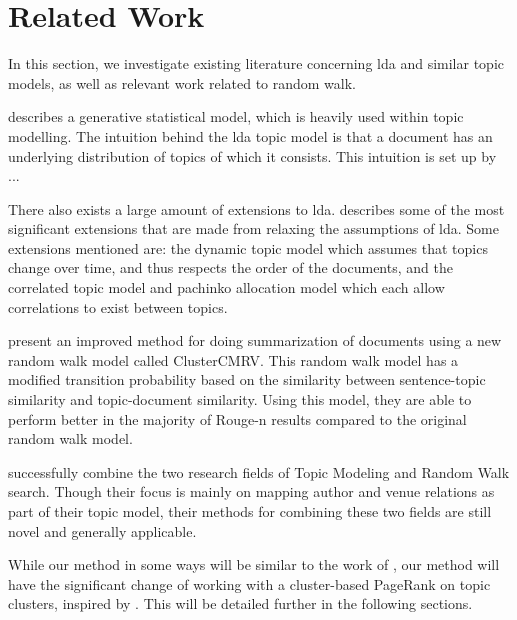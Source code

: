 \section{Related Work}\label{sec:related-works}
In this section, we investigate existing literature concerning \gls{lda} and similar topic models, as well as relevant work related to random walk.

\citet{lda} describes a generative statistical model, which is heavily used within topic modelling. 
The intuition behind the \gls{lda} topic model is that a document has an underlying distribution of topics of which it consists. 
This intuition is set up by ... 

There also exists a large amount of extensions to \gls{lda}.
\citet{blei2012topicmodels} describes some of the most significant extensions that are made from relaxing the assumptions of \gls{lda}.
Some extensions mentioned are: the dynamic topic model\cite{blei2006dynamic} which assumes that topics change over time, and thus respects the order of the documents, and the correlated topic model\cite{blei2007correlated} and pachinko allocation model\cite{li2006pachinko} which each allow correlations to exist between topics.

\citet{ClusterPageRank} present an improved method for doing summarization of documents using a new random walk model called ClusterCMRV. 
This random walk model has a modified transition probability based on the similarity between sentence-topic similarity and topic-document similarity.
Using this model, they are able to perform better in the majority of Rouge-n results compared to the original random walk model.

\citet{Tang2008} successfully combine the two research fields of Topic Modeling and Random Walk search. Though their focus is mainly on mapping author and venue relations as part of their topic model, their methods for combining these two fields are still novel and generally applicable.

While our method in some ways will be similar to the work of \citeauthor{Tang2008}, our method will have the significant change of working with a cluster-based PageRank on topic clusters, inspired by \cite{ClusterPageRank}.
This will be detailed further in the following sections.

